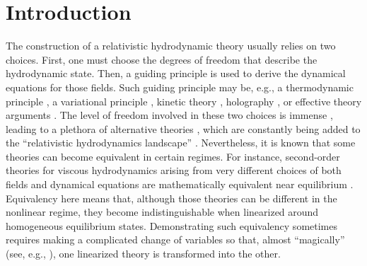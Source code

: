 \documentclass[aps,prl,singlecolumn,nofootinbib]{revtex4-2}
\theoremstyle{definition}
\theoremstyle{theorem}
\begin{document}
\section{Introduction}
The construction of a relativistic hydrodynamic theory usually relies on two choices. First, one must choose the degrees of freedom that describe the hydrodynamic state. Then, a guiding principle is used to derive the dynamical equations for those fields. Such guiding principle may be, e.g., a thermodynamic principle \cite{Israel_Stewart_1979,Muller_book,Otting1_1998,Salazar2020,GavassinoFronntiers2021}, a variational principle \cite{noto_rel,Dubosky2012_effective,TorrieriIS2016,GavassinoRadiazione}, kinetic theory \cite{Denicol2012Boltzmann}, holography \cite{Bhattacharyya:2007vjd,Baier2008}, or effective theory arguments \cite{Bemfica2017TheFirst,Kovtun2019,Bemfica:2019knx,Hoult:2020eho,Bemfica-Disconzi-Graber-2021,BemficaDNDefinitivo2020}. The level of freedom involved in these two choices is immense \cite{Geroch_Lindblom_1991_causal}, leading to a plethora of alternative theories  
, which are constantly being added to the ``relativistic hydrodynamics landscape'' \cite{Israel_Stewart_1979,Baier2008,Denicol2012Boltzmann,Florkowski:2010cf,Martinez:2010sc,Jaiswal:2013vta,Bemfica2017TheFirst,Kovtun2019,Bemfica:2019knx,Hoult:2020eho,BemficaDNDefinitivo2020,Florkowski_2018,
RauWasserman2020,Kiamari_2021,SperanzaChiral2021,
NoronhaGeneralFrame2021,Perna_2021,
GavassinoKhalatnikov2022,KeYin2022,
Singh2022,Most_2022,
HellerSingulant2022,Brito_2022,Wagner:2022ayd,SalazarZannias2022}. 
Nevertheless, it is known that some theories can become equivalent in certain regimes. For instance, second-order theories for viscous hydrodynamics arising from very different choices of both fields and dynamical equations  \cite{Hishcock1983,OlsonLifsh1990,GerochLindblom1990,
carter1991,Baier2008,Denicol2012Boltzmann,
Stricker2019} are mathematically equivalent near equilibrium \cite{Liu1986,PriouCOMPAR1991,GavassinoNonHydro2022,GavassinoGENERIC2022}. Equivalency here means that, although those theories can be different in the nonlinear regime, they become indistinguishable when linearized around homogeneous equilibrium states. Demonstrating such equivalency sometimes requires making a complicated change of variables so that, almost ``magically''  (see, e.g.,  \cite{GavassinoGENERIC2022}), one linearized theory is transformed into the other.
\end{document}
